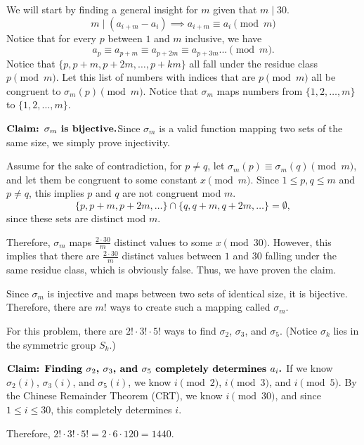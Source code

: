 \begin{enumerate}
 We will start by finding a general insight for \( m \) given that \( m \mid 30 \).  
 \[m \mid (a_{i + m} - a_i) \implies a_{i + m} \equiv a_i \pmod{m}\]  Notice that for every \( p \) between \( 1 \) and \( m \) inclusive, we have  
 \[a_p \equiv a_{p+m} \equiv a_{p+2m} \equiv a_{p+3m} ... \pmod{m}.\]  Notice that \( \{p, p+m, p+2m, \dots, p+km\} \) all fall under the residue class \( p \pmod{m} \).  Let this list of numbers with indices that are \( p \pmod{m} \) all be congruent to \( \sigma_m(p) \pmod{m} \).  Notice that \( \sigma_m \) maps numbers from \( \{1, 2, \dots, m\} \) to \( \{1, 2, \dots, m\} \).

 $\textbf{Claim: \( \sigma_m \) is bijective.}$Since \( \sigma_m \) is a valid function mapping two sets of the same size, we simply prove injectivity.  

 Assume for the sake of contradiction, for \( p \neq q \), let \( \sigma_m(p) \equiv \sigma_m(q) \pmod{m} \), and let them be congruent to some constant \( x \pmod{m} \).  Since \( 1 \leq p, q \leq m \) and \( p \neq q \), this implies \( p \) and \( q \) are not congruent mod \( m \).  
 \[\{p, p+m, p+2m, \dots \} \cap \{q, q+m, q+2m, \dots\} = \emptyset,\]  since these sets are distinct mod \( m \).  

 Therefore, \( \sigma_m \) maps \( \frac{2 \cdot 30}{m} \) distinct values to some \( x \pmod{30} \).  However, this implies that there are \( \frac{2 \cdot 30}{m} \) distinct values between \( 1 \) and \( 30 \) falling under the same residue class, which is obviously false.  Thus, we have proven the claim.  

 Since \( \sigma_m \) is injective and maps between two sets of identical size, it is bijective.  Therefore, there are \( m! \) ways to create such a mapping called \( \sigma_m \).  

 For this problem, there are \( 2! \cdot 3! \cdot 5! \) ways to find \( \sigma_2 \), \( \sigma_3 \), and \( \sigma_5 \).  (Notice \( \sigma_k \) lies in the symmetric group \( S_k \).)

 $\textbf{Claim: Finding \( \sigma_2 \), \( \sigma_3 \), and \( \sigma_5 \) completely determines \( a_i \).}$ If we know \( \sigma_2(i) \), \( \sigma_3(i) \), and \( \sigma_5(i) \), we know \( i \pmod{2} \), \( i \pmod{3} \), and \( i \pmod{5} \).  By the Chinese Remainder Theorem (CRT), we know \( i \pmod{30} \), and since \( 1 \leq i \leq 30 \), this completely determines \( i \).  

 Therefore, \( 2! \cdot 3! \cdot 5! = 2 \cdot 6 \cdot 120 = 1440 \).  


\end{enumerate}
